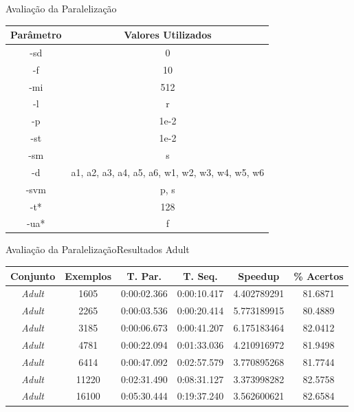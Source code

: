 \documentclass{beamer}
\begin{document}
\begin{frame}{Avaliação da Paralelização}
\begin{table}
    \centering
    \begin{tabular}{|c|c|} \hline
        Parâmetro & Valores Utilizados \\ \hline
        -sd & 0 \\ \hline
        -f & 10 \\ \hline
        -mi & 512 \\ \hline
        -l & r \\ \hline
        -p & 1e-2 \\ \hline
        -st & 1e-2 \\ \hline
        -sm & s \\ \hline
        -d & a1, a2, a3, a4, a5, a6, w1, w2, w3, w4, w5, w6\\ \hline
        -svm & p, s\\ \hline
        -t* & 128 \\ \hline
        -ua* & f \\ \hline
    \end{tabular}
\end{table}
\end{frame}

\begin{frame}{Avaliação da Paralelização}{Resultados Adult}
\begin{table}
    \small
    \centering
    \begin{tabular}{|c|c|c|c|c|c|} \hline
		Conjunto & Exemplos & T. Par. & T. Seq. & Speedup & \% Acertos\\ \hline
		\em{Adult} & 1605 & 0:00:02.366 & 0:00:10.417 & 4.402789291 & 81.6871\\ \hline
		\em{Adult} & 2265 & 0:00:03.536 & 0:00:20.414 & 5.773189915 & 80.4889\\ \hline
		\em{Adult} & 3185 & 0:00:06.673 & 0:00:41.207 & 6.175183464 & 82.0412\\ \hline
		\em{Adult} & 4781 & 0:00:22.094 & 0:01:33.036 & 4.210916972 & 81.9498\\ \hline
		\em{Adult} & 6414 & 0:00:47.092 & 0:02:57.579 & 3.770895268 & 81.7744\\ \hline
		\em{Adult} & 11220 & 0:02:31.490 & 0:08:31.127 & 3.373998282 & 82.5758\\ \hline
		\em{Adult} & 16100 & 0:05:30.444 & 0:19:37.240 & 3.562600621 & 82.6584\\ \hline
    \end{tabular}
\end{table}
\end{frame}
\end{document}
